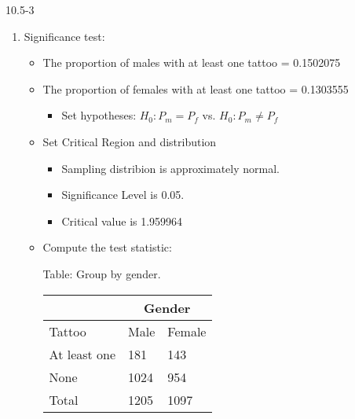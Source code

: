 \begin{exsol@solution}{10.5-3}

  	  \begin{enumerate}
	 \item Significance test:


\begin{itemize}
\item The proportion of males with at least one tattoo = 0.1502075
\item The proportion of females with at least one tattoo = 0.1303555
  \begin{itemize}
  \item Set hypotheses: $H_0: P_m = P_f$ vs. $H_0: P_m \ne P_f$
  \end{itemize}

\item Set Critical Region and distribution

  \begin{itemize}
  \item Sampling distribion is approximately normal.
  \item Significance Level is 0.05.
  \item Critical value is 1.959964
  \end{itemize}

\item Compute the test statistic:

\begin{minipage}[h]{6cm}

Table: Group  by gender.

      \begin{tabular}{@{} p{2.5cm} p{1cm} p{1cm} @{}} \hline %
     &  \multicolumn{2}{c}{Gender } \\ \hline
     Tattoo   & Male & Female \\ \hline
     At least one   & 181 & 143 \\
     None          & 1024 & 954 \\ \hline
     Total        & 1205 & 1097 \\ \hline
   \end{tabular}

\end{minipage} \hfill
\begin{minipage}[h]{6cm}


\end{minipage}
\end{itemize}
\end{enumerate}
\end{exsol@solution}
